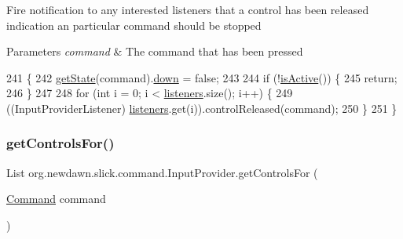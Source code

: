 Fire notification to any interested listeners that a control has been released indication an particular command should be stopped


\begin{DoxyParams}{Parameters}
{\em command} & The command that has been pressed \\
\hline
\end{DoxyParams}

\begin{DoxyCode}
241                                                  \{
242         \mbox{\hyperlink{classorg_1_1newdawn_1_1slick_1_1command_1_1_input_provider_aa25975d0cc21a4d1a45995c553e72357}{getState}}(command).\mbox{\hyperlink{classorg_1_1newdawn_1_1slick_1_1command_1_1_input_provider_1_1_command_state_a8cfa0dcf27d3c3a5f389bebea44da4b4}{down}} = \textcolor{keyword}{false};
243 
244         \textcolor{keywordflow}{if} (!\mbox{\hyperlink{classorg_1_1newdawn_1_1slick_1_1command_1_1_input_provider_a13cd156adf59ef712b9ebb4c0c21f2b8}{isActive}}()) \{
245             \textcolor{keywordflow}{return};
246         \}
247 
248         \textcolor{keywordflow}{for} (\textcolor{keywordtype}{int} i = 0; i < \mbox{\hyperlink{classorg_1_1newdawn_1_1slick_1_1command_1_1_input_provider_a007146935ecc6c0f69ff3d7958042867}{listeners}}.size(); i++) \{
249             ((InputProviderListener) \mbox{\hyperlink{classorg_1_1newdawn_1_1slick_1_1command_1_1_input_provider_a007146935ecc6c0f69ff3d7958042867}{listeners}}.get(i)).controlReleased(command);
250         \}
251     \}
\end{DoxyCode}
\mbox{\label{classorg_1_1newdawn_1_1slick_1_1command_1_1_input_provider_ab2b7def0bd26b6292ac45b4ca253e43a}} 
\subsubsection{\texorpdfstring{get\+Controls\+For()}{getControlsFor()}}
{\footnotesize\ttfamily List org.\+newdawn.\+slick.\+command.\+Input\+Provider.\+get\+Controls\+For (\begin{DoxyParamCaption}\item[{\mbox{\hyperlink{interfaceorg_1_1newdawn_1_1slick_1_1command_1_1_command}{Command}}}]{command }\end{DoxyParamCaption})\hspace{0.3cm}{\ttfamily [inline]}}

